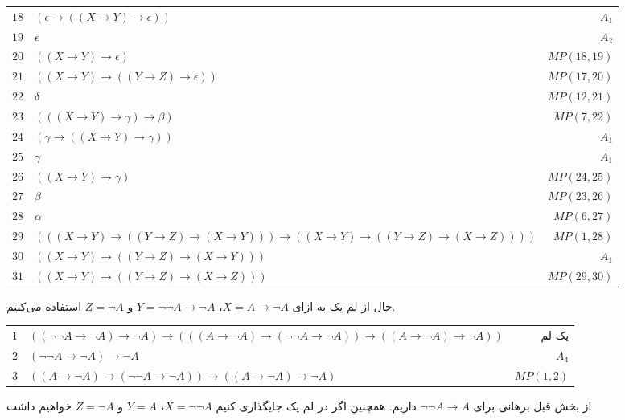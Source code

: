 \begin{ans}
{\begin{tabular*}{\textwidth}{l l r}
      $18$ & $( \epsilon  \rightarrow ((X \rightarrow Y) \rightarrow  \epsilon ))$ & $A_1$ \\
      $19$ & $ \epsilon $ & $A_2$ \\
      $20$ & $((X \rightarrow Y) \rightarrow  \epsilon )$ & $MP(18,19)$ \\
      $21$ & $((X \rightarrow Y) \rightarrow ((Y \rightarrow Z) \rightarrow  \epsilon ))$ & $MP(17,20)$ \\
      $22$ & $\delta $ & $MP(12,21)$ \\
      $23$ & $(((X \rightarrow Y) \rightarrow  \gamma ) \rightarrow  \beta )$ & $MP(7,22)$ \\
      $24$ & $( \gamma  \rightarrow ((X \rightarrow Y) \rightarrow  \gamma ))$ & $A_1$ \\
      $25$ & $ \gamma $ & $A_1$ \\
      $26$ & $((X \rightarrow Y) \rightarrow  \gamma )$ & $MP(24,25)$ \\
      $27$ & $ \beta $ & $MP(23,26)$ \\
      $28$ & $ \alpha $ &  $MP(6,27)$ \\
      $29$ & $(((X \rightarrow Y) \rightarrow ((Y \rightarrow Z) \rightarrow (X \rightarrow Y))) \rightarrow ((X \rightarrow Y) \rightarrow ((Y \rightarrow Z) \rightarrow (X \rightarrow Z))))$ & $MP(1,28)$ \\
      $30$ & $((X \rightarrow Y) \rightarrow ((Y \rightarrow Z) \rightarrow (X \rightarrow Y)))$ & $A_1$ \\
      $31$ & $((X \rightarrow Y) \rightarrow ((Y \rightarrow Z) \rightarrow (X \rightarrow Z)))$ & $MP(29,30)$
    \end{tabular*}}
    \RTL حال از لم یک به ازای $X = A \rightarrow \neg A$، $Y = \neg \neg A \rightarrow \neg A$ و $Z = \neg A$ استفاده می‌کنیم.
    {\LTR \footnotesize
    \begin{tabular*}{\textwidth}{l l r}
      $1$ & $((\neg \neg A \rightarrow \neg A) \rightarrow \neg A) \rightarrow (((A \rightarrow \neg A) \rightarrow (\neg \neg A \rightarrow \neg A)) \rightarrow ((A \rightarrow \neg A) \rightarrow \neg A))$ & یک لم \\
      $2$ & $(\neg \neg A \rightarrow \neg A) \rightarrow \neg A$ & $A_4$ \\
      $3$ & $((A \rightarrow \neg A) \rightarrow (\neg \neg A \rightarrow \neg A)) \rightarrow ((A \rightarrow \neg A) \rightarrow \neg A)$ & $MP(1, 2)$
    \end{tabular*}}
    \RTL
    از بخش قبل برهانی برای $\neg \neg A \rightarrow A$ داریم. همچنین اگر در لم یک جایگذاری کنیم $X = \neg \neg A$، $Y = A$ و $Z = \neg A$ خواهیم داشت

\end{ans}
